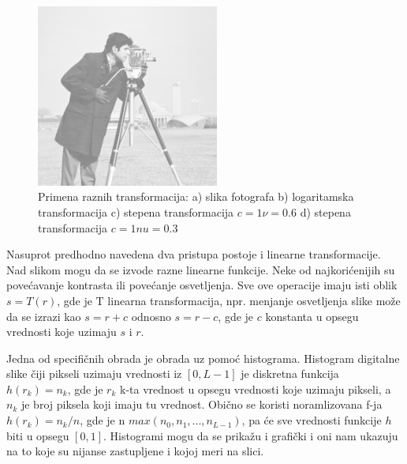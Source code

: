 \documentclass[a4paper,12pt,titlepage]{article}
\begin{document}
\begin{figure}[ht!]
\includegraphics[width=60mm]{img/imgPow2.png}
\caption{Primena raznih transformacija: a) slika fotografa b) logaritamska transformacija c) stepena transformacija $c = 1 \nu = 0.6$ d) stepena transformacija $c = 1 nu = 0.3$}
\label{overflow}
\end{figure} 

Nasuprot predhodno navedena dva pristupa postoje i linearne transformacije. Nad slikom mogu da se izvode razne linearne funkcije. Neke od najkorićenijih su povećavanje kontrasta ili povećanje osvetljenja. Sve ove operacije imaju isti oblik $s = T(r)$, gde je T linearna transformacija, npr. menjanje osvetljenja slike može da se izrazi kao $s = r + c$ odnosno $s = r - c$, gde je $c$ konstanta u opsegu vrednosti koje uzimaju $s$ i $r$. 

Jedna od specifičnih obrada je obrada uz pomoć histograma. Histogram digitalne slike čiji pikseli uzimaju vrednosti iz $[0, L - 1]$ je diskretna funkcija $h(r_{k}) = n_{k}$, gde je $r_{k}$ k-ta vrednost u opsegu vrednosti koje uzimaju pikseli, a $n_{k}$ je broj piksela koji imaju tu vrednost. Obično se koristi noramlizovana f-ja $h(r_{k}) = n_{k}/n$, gde je n $max(n_{0}, n_{1}, ... , n_{L - 1})$, pa će sve vrednosti funkcije $h$ biti u opsegu $[0, 1]$. Histogrami mogu da se prikažu i grafički i oni nam ukazuju na to koje su nijanse zastupljene i kojoj meri na slici. 
\end{document}
